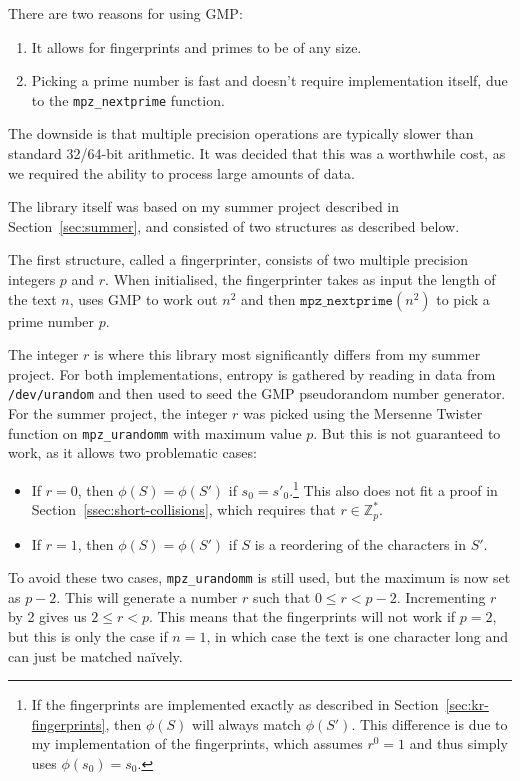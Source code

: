 \documentclass[ %
                    author={Dominic Joseph Moylett},
                    degree={MEng},
                     title={Dictionary Matching with Fingerprints},
                  subtitle={An Empirical Analysis},
                      type={research},
                      year={2015} ]{dissertation}
\begin{document}
There are two reasons for using GMP:
\begin{enumerate}
  \item It allows for fingerprints and primes to be of any size.
  \item Picking a prime number is fast and doesn't require implementation itself, due to the \texttt{mpz\_nextprime} function.
\end{enumerate}

The downside is that multiple precision operations are typically slower than standard 32/64-bit arithmetic. It was decided that this was a worthwhile cost, as we required the ability to process large amounts of data.

The library itself was based on my summer project described in Section~\ref{sec:summer}, and consisted of two structures as described below.

The first structure, called a fingerprinter, consists of two multiple precision integers $p$ and $r$. When initialised, the fingerprinter takes as input the length of the text $n$, uses GMP to work out $n^2$ and then $\texttt{mpz\_nextprime}(n^2)$ to pick a prime number $p$.

The integer $r$ is where this library most significantly differs from my summer project. For both implementations, entropy is gathered by reading in data from \texttt{/dev/urandom} and then used to seed the GMP pseudorandom number generator. For the summer project, the integer $r$ was picked using the Mersenne Twister function on \texttt{mpz\_urandomm} with maximum value $p$. But this is not guaranteed to work, as it allows two problematic cases:

\begin{itemize}
  \item If $r = 0$, then $\phi(S) = \phi(S')$ if $s_0 = s'_0$.\footnote{If the fingerprints are implemented exactly as described in Section~\ref{sec:kr-fingerprints}, then $\phi(S)$ will always match $\phi(S')$. This difference is due to my implementation of the fingerprints, which assumes $r^0 = 1$ and thus simply uses $\phi(s_0) = s_0$.} This also does not fit a proof in Section~\ref{ssec:short-collisions}, which requires that $r \in \mathbb{Z}^*_p$.
  \item If $r = 1$, then $\phi(S) = \phi(S')$ if $S$ is a reordering of the characters in $S'$.
\end{itemize}

To avoid these two cases, \texttt{mpz\_urandomm} is still used, but the maximum is now set as $p-2$. This will generate a number $r$ such that $0 \leq r < p-2$. Incrementing $r$ by 2 gives us $2 \leq r < p$. This means that the fingerprints will not work if $p = 2$, but this is only the case if $n = 1$, in which case the text is one character long and can just be matched na\"{i}vely.
\end{document}
